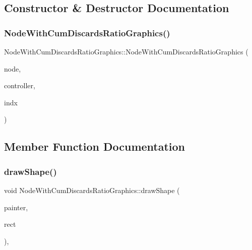 \subsection{Constructor \& Destructor Documentation}
\mbox{\label{class_node_with_cum_discards_ratio_graphics_a883dab295c7ace76665c29b6d43c839c}} 
\subsubsection{\texorpdfstring{NodeWithCumDiscardsRatioGraphics()}{NodeWithCumDiscardsRatioGraphics()}}
{\footnotesize\ttfamily Node\+With\+Cum\+Discards\+Ratio\+Graphics\+::\+Node\+With\+Cum\+Discards\+Ratio\+Graphics (\begin{DoxyParamCaption}\item[{\mbox{\hyperlink{class_node_data}{Node\+Data}} $\ast$}]{node,  }\item[{\mbox{\hyperlink{class_map_objects_controller}{Map\+Objects\+Controller}} $\ast$}]{controller,  }\item[{int}]{indx }\end{DoxyParamCaption})\hspace{0.3cm}{\ttfamily [inline]}}



\subsection{Member Function Documentation}
\mbox{\label{class_node_with_cum_discards_ratio_graphics_afd548bf7f8e48643feeed76894e256e6}} 
\subsubsection{\texorpdfstring{drawShape()}{drawShape()}}
{\footnotesize\ttfamily void Node\+With\+Cum\+Discards\+Ratio\+Graphics\+::draw\+Shape (\begin{DoxyParamCaption}\item[{Q\+Painter \&}]{painter,  }\item[{const qmapcontrol\+::\+Rect\+World\+Px \&}]{rect }\end{DoxyParamCaption})\hspace{0.3cm}{\ttfamily [protected]}, {\ttfamily [virtual]}}



